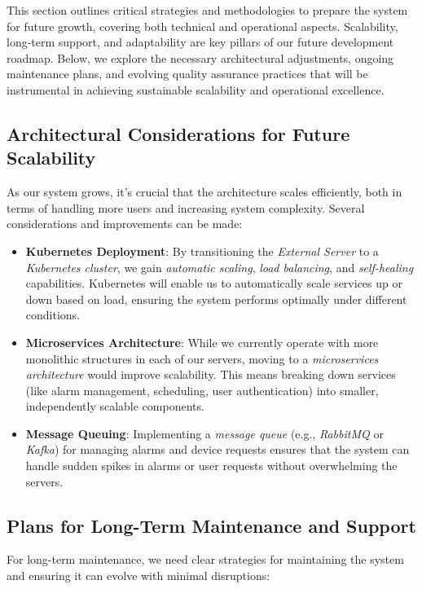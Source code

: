 \documentclass{article}
\begin{document}
This section outlines critical strategies and methodologies to prepare the system for future growth, covering both technical and operational aspects. Scalability, long-term support, and adaptability are key pillars of our future development roadmap. Below, we explore the necessary architectural adjustments, ongoing maintenance plans, and evolving quality assurance practices that will be instrumental in achieving sustainable scalability and operational excellence.

\subsection{Architectural Considerations for Future Scalability}

As our system grows, it’s crucial that the architecture scales efficiently, both in terms of handling more users and increasing system complexity. Several considerations and improvements can be made:

\begin{itemize}
    \item \textbf{Kubernetes Deployment}: By transitioning the \textit{External Server} to a \textit{Kubernetes cluster}, we gain \textit{automatic scaling}, \textit{load balancing}, and \textit{self-healing} capabilities. Kubernetes will enable us to automatically scale services up or down based on load, ensuring the system performs optimally under different conditions.
    \item \textbf{Microservices Architecture}: While we currently operate with more monolithic structures in each of our servers, moving to a \textit{microservices architecture} would improve scalability. This means breaking down services (like alarm management, scheduling, user authentication) into smaller, independently scalable components.
    \item \textbf{Message Queuing}: Implementing a \textit{message queue} (e.g., \textit{RabbitMQ} or \textit{Kafka}) for managing alarms and device requests ensures that the system can handle sudden spikes in alarms or user requests without overwhelming the servers.
\end{itemize}

\subsection{Plans for Long-Term Maintenance and Support}

For long-term maintenance, we need clear strategies for maintaining the system and ensuring it can evolve with minimal disruptions:
\end{document}
